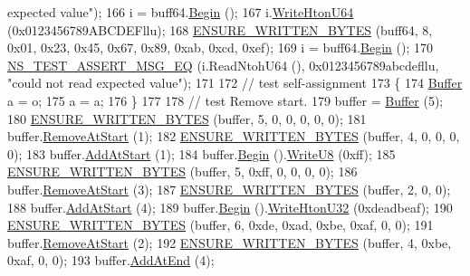 \begin{DoxyCode}
{       expected value"});
166   i = buff64.\hyperlink{classns3_1_1Buffer_a893d4bf50df13e730b6cd0fda91b967f}{Begin} ();
167   i.\hyperlink{classns3_1_1Buffer_1_1Iterator_a2d6eb710a2300eabe1dd0e9698770966}{WriteHtonU64} (0x0123456789ABCDEFllu);
168   \hyperlink{buffer-test_8cc_adb8db1b0f6eec9da1f9f6d8b9f1e4ba8}{ENSURE\_WRITTEN\_BYTES} (buff64, 8, 0x01, 0x23, 0x45, 0x67, 0x89, 0xab, 0xcd, 0xef);
169   i = buff64.\hyperlink{classns3_1_1Buffer_a893d4bf50df13e730b6cd0fda91b967f}{Begin} ();
170   \hyperlink{group__testing_ga2a9d78cffb3db8e867c35fff0b698cf5}{NS\_TEST\_ASSERT\_MSG\_EQ} (i.ReadNtohU64 (), 0x0123456789abcdefllu, \textcolor{stringliteral}{"could not read
       expected value"});
171 
172   \textcolor{comment}{// test self-assignment}
173   \{
174     \hyperlink{classns3_1_1Buffer}{Buffer} a = o;
175     a = a;
176   \}
177 
178   \textcolor{comment}{// test Remove start.}
179   buffer = \hyperlink{classns3_1_1Buffer}{Buffer} (5);
180   \hyperlink{buffer-test_8cc_adb8db1b0f6eec9da1f9f6d8b9f1e4ba8}{ENSURE\_WRITTEN\_BYTES} (buffer, 5, 0, 0, 0, 0, 0);
181   buffer.\hyperlink{classns3_1_1Buffer_adeecbb3e8f518aec6fee0437578ade4b}{RemoveAtStart} (1);
182   \hyperlink{buffer-test_8cc_adb8db1b0f6eec9da1f9f6d8b9f1e4ba8}{ENSURE\_WRITTEN\_BYTES} (buffer, 4, 0, 0, 0, 0);
183   buffer.\hyperlink{classns3_1_1Buffer_a8abd8164c3671d3dadc98fc66fade7b1}{AddAtStart} (1);
184   buffer.\hyperlink{classns3_1_1Buffer_a893d4bf50df13e730b6cd0fda91b967f}{Begin} ().\hyperlink{classns3_1_1Buffer_1_1Iterator_a3c7bacca6cbb821c9d14fa4626b7ae16}{WriteU8} (0xff);
185   \hyperlink{buffer-test_8cc_adb8db1b0f6eec9da1f9f6d8b9f1e4ba8}{ENSURE\_WRITTEN\_BYTES} (buffer, 5, 0xff, 0, 0, 0, 0);
186   buffer.\hyperlink{classns3_1_1Buffer_adeecbb3e8f518aec6fee0437578ade4b}{RemoveAtStart} (3);
187   \hyperlink{buffer-test_8cc_adb8db1b0f6eec9da1f9f6d8b9f1e4ba8}{ENSURE\_WRITTEN\_BYTES} (buffer, 2, 0, 0);
188   buffer.\hyperlink{classns3_1_1Buffer_a8abd8164c3671d3dadc98fc66fade7b1}{AddAtStart} (4);
189   buffer.\hyperlink{classns3_1_1Buffer_a893d4bf50df13e730b6cd0fda91b967f}{Begin} ().\hyperlink{classns3_1_1Buffer_1_1Iterator_ac8a95d099acc1fa0e699200b4de82173}{WriteHtonU32} (0xdeadbeaf);
190   \hyperlink{buffer-test_8cc_adb8db1b0f6eec9da1f9f6d8b9f1e4ba8}{ENSURE\_WRITTEN\_BYTES} (buffer, 6,  0xde, 0xad, 0xbe, 0xaf, 0, 0);
191   buffer.\hyperlink{classns3_1_1Buffer_adeecbb3e8f518aec6fee0437578ade4b}{RemoveAtStart} (2);
192   \hyperlink{buffer-test_8cc_adb8db1b0f6eec9da1f9f6d8b9f1e4ba8}{ENSURE\_WRITTEN\_BYTES} (buffer, 4,  0xbe, 0xaf, 0, 0);
193   buffer.\hyperlink{classns3_1_1Buffer_a92dd87809af24fb10696fee9a9cb56cf}{AddAtEnd} (4);

\end{DoxyCode}
